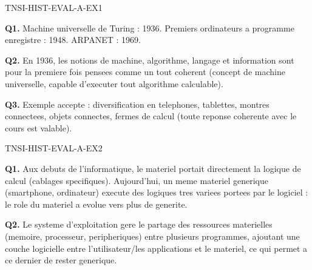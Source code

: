 \begin{corrige}{TNSI-HIST-EVAL-A-EX1}

\textbf{Q1.} Machine universelle de Turing : 1936. Premiers ordinateurs a programme enregistre : 1948. ARPANET : 1969.

\textbf{Q2.} En 1936, les notions de machine, algorithme, langage et information sont pour la premiere fois pensees comme un tout coherent (concept de machine universelle, capable d'executer tout algorithme calculable).

\textbf{Q3.} Exemple accepte : diversification en telephones, tablettes, montres connectees, objets connectes, fermes de calcul (toute reponse coherente avec le cours est valable).

\end{corrige}

\begin{corrige}{TNSI-HIST-EVAL-A-EX2}

\textbf{Q1.} Aux debuts de l'informatique, le materiel portait directement la logique de calcul (cablages specifiques). Aujourd'hui, un meme materiel generique (smartphone, ordinateur) execute des logiques tres variees portees par le logiciel : le role du materiel a evolue vers plus de generite.

\textbf{Q2.} Le systeme d'exploitation gere le partage des ressources materielles (memoire, processeur, peripheriques) entre plusieurs programmes, ajoutant une couche logicielle entre l'utilisateur/les applications et le materiel, ce qui permet a ce dernier de rester generique.

\end{corrige}
